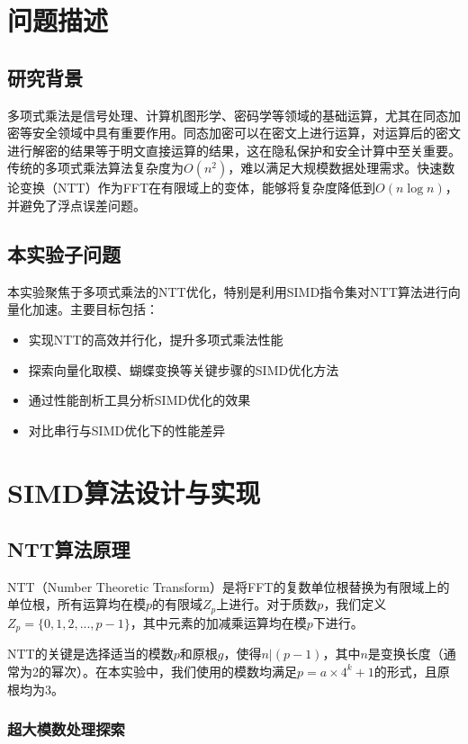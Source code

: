 \documentclass[a4paper,colorlinks=true,linkcolor=blue,urlcolor=blue,citecolor=green,bookmarks=true]{article}
\begin{document}
\clearpage
\tableofcontents
\clearpage

\section{问题描述}

\subsection{研究背景}
多项式乘法是信号处理、计算机图形学、密码学等领域的基础运算，尤其在同态加密等安全领域中具有重要作用。同态加密可以在密文上进行运算，对运算后的密文进行解密的结果等于明文直接运算的结果，这在隐私保护和安全计算中至关重要。传统的多项式乘法算法复杂度为$O(n^2)$，难以满足大规模数据处理需求。快速数论变换（NTT）作为FFT在有限域上的变体，能够将复杂度降低到$O(n\log n)$，并避免了浮点误差问题。

\subsection{本实验子问题}
本实验聚焦于多项式乘法的NTT优化，特别是利用SIMD指令集对NTT算法进行向量化加速。主要目标包括：
\begin{itemize}
  \item 实现NTT的高效并行化，提升多项式乘法性能
  \item 探索向量化取模、蝴蝶变换等关键步骤的SIMD优化方法
  \item 通过性能剖析工具分析SIMD优化的效果
  \item 对比串行与SIMD优化下的性能差异
\end{itemize}

\section{SIMD算法设计与实现}

\subsection{NTT算法原理}
NTT（Number Theoretic Transform）是将FFT的复数单位根替换为有限域上的单位根，所有运算均在模$p$的有限域$Z_p$上进行。对于质数$p$，我们定义$Z_p=\{0,1,2,...,p-1\}$，其中元素的加减乘运算均在模$p$下进行\cite{harvey2014}。

NTT的关键是选择适当的模数$p$和原根$g$，使得$n|(p-1)$，其中$n$是变换长度（通常为2的幂次）。在本实验中，我们使用的模数均满足$p = a \times 4^k + 1$的形式，且原根均为3\cite{longa2016}。

\subsubsection{超大模数处理探索}
\end{document}
